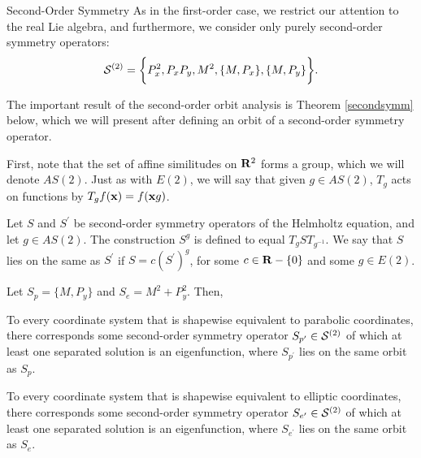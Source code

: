 \begin{section}{Second-Order Symmetry}
As in the first-order case, we restrict our attention to the real Lie algebra, and furthermore, we consider only purely second-order symmetry operators:
\[
\mathcal{S}^{(2)} = \bigg\{ P_x^2, P_xP_y, M^2, \{ M,P_x \}, \{ M,P_y \} \bigg\}.
\]

The important result of the second-order orbit analysis is Theorem \ref{secondsymm} below, which we will present after defining an orbit of a second-order symmetry operator.

First, note that the set of affine similitudes on $\mathbf{R}^2$ forms a group, which we will denote $AS(2)$.  Just as with $E(2)$, we will say that given $g \in AS(2)$, $T_g$ acts on functions by $T_g f(\mathbf{x}) = f(\mathbf{x} g)$.

\begin{definition}
\label{secondsymmorbit}
Let $S$ and $S^\prime$ be second-order symmetry operators of the Helmholtz equation, and let $g \in AS(2)$.  The construction $S^g$ is defined to equal $T_g S T_{g^{-1}}$.  We say that $S$ lies on the same  as $S^\prime$ if $S = c(S^\prime)^g$, for some $c \in \mathbf{R} - \{ 0 \}$ and some $g \in E(2)$.
\end{definition}

\begin{theorem}
\label{secondsymm}
Let $S_p = \{ M,P_y \}$ and $S_e = M^2 + P_y^2$.  Then,

 To every coordinate system that is shapewise equivalent to parabolic coordinates, there corresponds some second-order symmetry operator $S_{p^\prime} \in \mathcal{S}^{(2)}$ of which at least one separated solution is an eigenfunction, where $S_{p^\prime}$ lies on the same orbit as $S_p$.

 To every coordinate system that is shapewise equivalent to elliptic coordinates, there corresponds some second-order symmetry operator $S_{e^\prime} \in \mathcal{S}^{(2)}$ of which at least one separated solution is an eigenfunction, where $S_{e^\prime}$ lies on the same orbit as $S_e$.
\end{theorem}

\end{section}